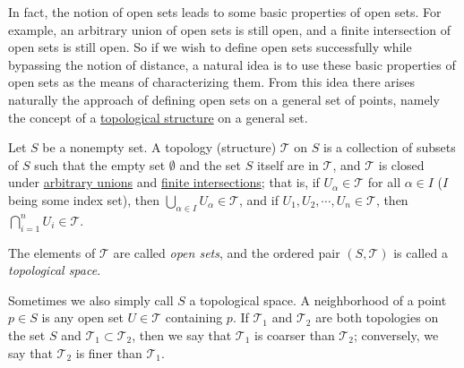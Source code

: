 In fact, the notion of open sets leads to some basic properties of open sets.
For example, an arbitrary union of open sets is still open, and a finite
intersection of open sets is still open. So if we wish to define open sets
successfully while bypassing the notion of distance, a natural idea is to use
these basic properties of open sets as the means of characterizing them. From
this idea there arises naturally the approach of defining open sets on a
general set of points, namely the concept of a \underline{topological
structure} on a general set.


\begin{definition}
	Let $S$ be a nonempty set. A topology (structure) $\mathcal{T}$ on $S$ is
	a collection of subsets of $S$ such that the empty set $\emptyset$ and the
	set $S$ itself are in $\mathcal{T}$, and $\mathcal{T}$ is closed under
	\underline{arbitrary unions} and \underline{finite intersections}; that
	is, if $U_\alpha \in \mathcal{T}$ for all $\alpha\in I$ ($I$ being some
	index set), then $\bigcup_{\alpha\in I} U_\alpha \in \mathcal{T}$, and if
	$U_1,U_2,\cdots, U_n\in\mathcal{T}$, then
	$\bigcap_{i=1}^n U_i\in\mathcal{T}$.

	The elements of $\mathcal{T}$ are called \emph{open sets}, and the
	ordered pair $(S,\mathcal{T})$ is called a \emph{topological space}.

\end{definition}

\begin{remark}
	Sometimes we also simply call $S$ a topological space. A neighborhood of
	a point $p\in S$ is any open set $U\in \mathcal{T}$ containing $p$. If
	$\mathcal{T}_1$ and $\mathcal{T}_2$ are both topologies on the set $S$
	and $\mathcal{T}_1\subset \mathcal{T}_2$, then we say that
	$\mathcal{T}_1$ is coarser than $\mathcal{T}_2$; conversely, we say that
	$\mathcal{T}_2$ is finer than $\mathcal{T}_1$.
\end{remark}

